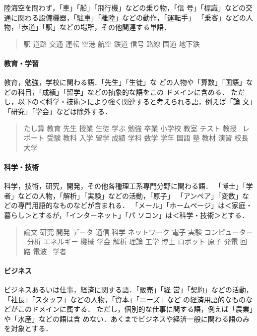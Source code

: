 \documentclass[a4j,titlepage]{jarticle}
\begin{document}
陸海空を問わず，「車」「船」「飛行機」などの乗り物，「信
号」「標識」などの交通に関わる設備機器，「駐車」「離陸」などの動作，「運転手」
「乗客」などの人物，「歩道」「駅」などの場所，その他関連する単語．

\begin{quote}
駅 道路 交通 運転 空港 航空 鉄道 信号 路線 国道 地下鉄
\end{quote}


\paragraph{教育・学習}

教育，勉強，学校に関わる語．「先生」「生徒」な
どの人物や「算数」「国語」などの科目，「成績」「留学」などの抽象的な語をこの
ドメインに含める．
ただし，以下の＜科学・技術＞により強く関連すると考えられる語，例えば「論
文」「研究」「学会」などは除外する．

\begin{quote}
たし算 教育 先生 授業 生徒 学ぶ 勉強 卒業 小学校 教室 テスト 教授 
\ レポート 受験 教科 入学 留学 成績 学科 数学 学年 国語 塾 教材 演習 校長 大学
\end{quote}


\paragraph{科学・技術}

科学，技術，研究，開発，その他各種理工系専門分野に関わる語．
「博士」「学者」などの人物，「解析」「実験」などの活動，「原子」
「アンペア」「変数」などの専門用語的なものなどが含まれる．
「メール」「ホームページ」は＜家庭・暮らし＞とするが，「インターネット」「パ
ソコン」は＜科学・技術＞とする．

\begin{quote}
論文 研究 開発 データ 通信 科学 ネットワーク 電子 実験 コンピューター 
\ 分析 エネルギー 機械 学会 解析 理論 工学 博士 ロボット 原子 発電 回路 電波 
\ 学者
\end{quote}


\paragraph{ビジネス}

ビジネスあるいは仕事，経済に関する語．「販売」「経
営」「契約」などの活動，「社長」「スタッフ」などの人物，「資本」「ニーズ」など
の経済用語的なものなどがこのドメインに属する．
ただし，個別的な仕事に関する語，例えば「農業」や「水産」などの語は含
めない．あくまでビジネスや経済一般に関わる語のみを対象とする．
\end{document}
